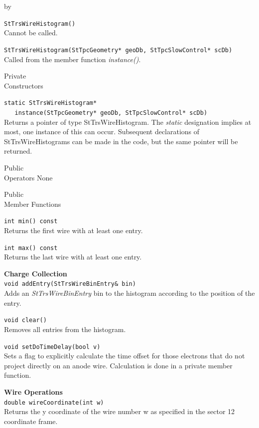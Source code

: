 \documentclass[twoside]{article}
\newcommand{\entrylabel}[1]{\mbox{\textbf{{#1}}}\hfil}%
\newenvironment{entry}
{\begin{list}{}%
    {\renewcommand{\makelabel}{\entrylabel}%
     \setlength{\labelwidth}{90pt}%
     \setlength{\leftmargin}{\labelwidth}
     \advance\leftmargin by \labelsep%
      }%
    }%
  {\end{list}}
\newcommand{\Entrylabel}[1]%
{\raisebox{0pt}[1ex][0pt]{\makebox[\labelwidth][l]%
    {\parbox[t]{\labelwidth}{\hspace{0pt}\textbf{{#1}}}}}}
\newenvironment{Entry}%
{\renewcommand{\entrylabel}{\Entrylabel}\begin{entry}}%
  {\end{entry}}
\begin{document}
\begin{Entry}
   \verb+StTrsWireHistogram()+\\
   Cannot be called.

  \verb+StTrsWireHistogram(StTpcGeometry* geoDb, StTpcSlowControl* scDb)+\\
  Called from the member function {\em instance()}.
  
\item[Private \\ Constructors]

  \verb+static StTrsWireHistogram*+\\
  \verb+   instance(StTpcGeometry* geoDb, StTpcSlowControl* scDb)+\\
   Returns a pointer of type StTrsWireHistogram.  The {\em static}
   designation implies at most, one instance of this can occur.
   Subsequent declarations of StTrsWireHistograms can be made in the
   code, but the same pointer will be returned.
   
\item[Public \\ Operators]
   None

\item[Public \\ Member Functions]

  \verb+int min() const+\\
  Returns the first wire with at least one entry.
  
  \verb+int max() const+\\
  Returns the last wire with at least one entry.

  {\bf Charge Collection} \\
  \verb+void addEntry(StTrsWireBinEntry& bin)+\\
  Adds an {\em StTrsWireBinEntry} bin to the histogram according
  to the position of the entry.

  \verb+void clear()+\\
  Removes all entries from the histogram.

  \verb+void setDoTimeDelay(bool v)+\\
  Sets a flag to explicitly calculate the time offset for those
  electrons that do not project directly on an anode wire.
  Calculation is done in a private member function.
  
  {\bf Wire Operations} \\
  \verb+double wireCoordinate(int w)+\\
  Returns the y coordinate of the wire number w as specified
  in the sector 12 coordinate frame.
  

\end{Entry}
\end{document}

